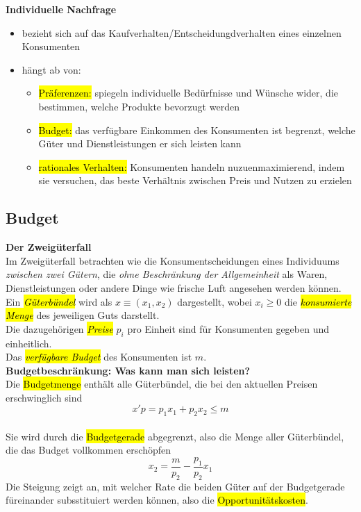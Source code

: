 \documentclass[a4paper, 10pt]{article}
\begin{document}
\textbf{Individuelle Nachfrage}
\begin{itemize}
    \item bezieht sich auf das Kaufverhalten/Entscheidungdverhalten eines einzelnen Konsumenten
    \item hängt ab von:
    \begin{itemize}
    \item \hl{Präferenzen:} spiegeln individuelle Bedürfnisse und Wünsche wider, die bestimmen, welche Produkte bevorzugt werden
    \item \hl{Budget:} das verfügbare Einkommen des Konsumenten ist begrenzt, welche Güter und Dienstleistungen er sich leisten kann
    \item \hl{rationales Verhalten:} Konsumenten handeln nuzuenmaximierend, indem sie versuchen, das beste Verhältnis zwischen Preis und Nutzen zu erzielen
\end{itemize}
\end{itemize}


\subsection{Budget}
\textbf{Der Zweigüterfall}\\
Im Zweigüterfall betrachten wie die Konsumentscheidungen eines Individuums \textit{zwischen zwei Gütern}, die \textit{ohne Beschränkung der Allgemeinheit} als Waren, Dienstleistungen oder andere Dinge wie frische Luft angesehen werden können.\\
Ein \textit{\hl{Güterbündel}} wird als $x \equiv (x_1, x_2)$ dargestellt, wobei $x_i \geq 0$ die \textit{\hl{konsumierte Menge}} des jeweiligen Guts darstellt.\\
Die dazugehörigen \textit{\hl{Preise}} $p_i$ pro Einheit sind für Konsumenten gegeben und einheitlich. \\
Das \textit{\hl{verfügbare Budget}} des Konsumenten ist $m$.\\[4mm]
\textbf{Budgetbeschränkung: Was kann man sich leisten?}\\
Die \hl{Budgetmenge} enthält alle Güterbündel, die bei den aktuellen Preisen erschwinglich sind \\
\begin{equation}
    x'p = p_1 x_1 + p_2 x_2 \leq m
\end{equation}\\
Sie wird durch die \hl{Budgetgerade} abgegrenzt, also die Menge aller Güterbündel, die das Budget vollkommen erschöpfen
\begin{equation}
    x_2 = \frac{m}{p_2} - \frac{p_1}{p_2}x_1
\end{equation}
Die Steigung zeigt an, mit welcher Rate die beiden Güter auf der Budgetgerade füreinander subsstituiert werden können, also die \hl{Opportunitätskosten}.
\end{document}

